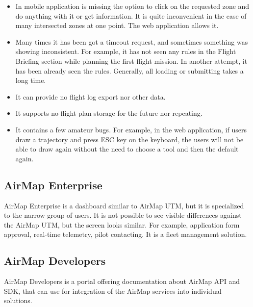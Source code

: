 \begin{itemize}
    \item In mobile application is missing the option to click on the requested zone and do anything with it or get information.
    It is quite inconvenient in the case of many intersected zones at one point.
    The web application allows it.
    \item Many times it has been got a timeout request, and sometimes something was showing inconsistent.
    For example, it has not seen any rules in the Flight Briefing section while planning the first flight mission.
    In another attempt, it has been already seen the rules.
    Generally, all loading or submitting takes a long time.
    \item It can provide no flight log export nor other data.
    \item It supports no flight plan storage for the future nor repeating.
    \item It contains a few amateur bugs.
    For example, in the web application, if users draw a trajectory and press ESC key on the keyboard, the users will not be able to draw again without the need to choose a tool and then the default again.
\end{itemize}


\subsection{AirMap Enterprise}\label{subsec:airmap-enterprise}
AirMap Enterprise is a dashboard similar to AirMap UTM, but it is specialized to the narrow group of users.
It is not possible to see visible differences against the AirMap UTM, but the screen looks similar.
For example, application form approval, real-time telemetry, pilot contacting.
It is a fleet management solution.


\subsection{AirMap Developers}\label{subsec:airmap-developers}
AirMap Developers is a portal offering documentation about AirMap API and SDK, that can use for integration of the AirMap services into individual solutions.~\cite{airMapDevelopers}
